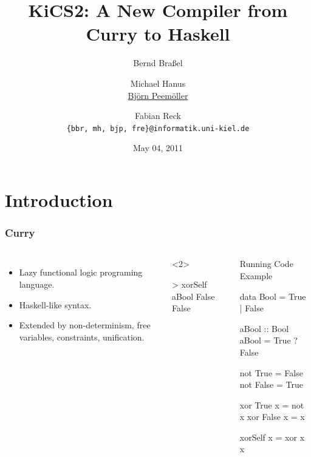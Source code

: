 \documentclass[utf8]{beamer}
\newenvironment{program}{\begin{semiverbatim}\small}{\end{semiverbatim}}
\begin{document}
\title[KiCS2]{KiCS2: A New Compiler from Curry to Haskell}

\date{May 04, 2011}

\author[B. Braßel, M. Hanus, \underline{B. Peemöller}, F. Reck]
 {Bernd Braßel \and Michael Hanus \\
   \underline{Björn Peemöller} \and Fabian Reck\\
  \texttt{\{bbr, mh, bjp, fre\}@informatik.uni-kiel.de}}


\begin{frame}
\titlepage
\end{frame}

\section{Introduction}

\begin{frame}[fragile]
\frametitle{Curry}
\begin{columns}[t]
\begin{itemize}
\item Lazy functional logic programing language.
\item Haskell-like syntax.
\item Extended by non-determinism, free variables, constraints, unification.
\end{itemize}
\begin{example}<2>
\begin{program}
> xorSelf aBool
False
False
\end{program}
\end{example}
\begin{block}{Running Code Example}
\begin{program}
data Bool = True | False

aBool :: Bool
aBool = True ? False

not True  = False
not False = True

xor True  x = not x
xor False x = x

xorSelf x = xor x x
\end{program}
\end{block}
\end{columns}
\end{frame}
\end{document}
